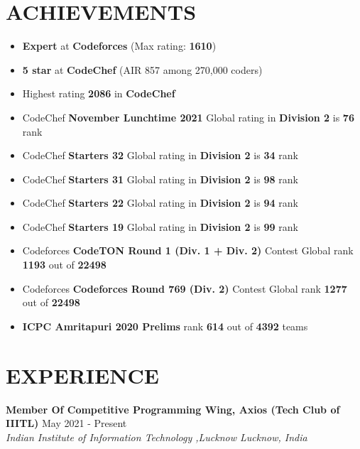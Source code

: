 \documentclass[12pt]{article}
\begin{document}
\section*{ACHIEVEMENTS}
\begin{itemize}[leftmargin=*, topsep=0pt,itemsep=2pt,partopsep=2pt, parsep=2pt]
\item \textbf{Expert} at \textbf{Codeforces} (Max rating: \textbf{1610})
\item \textbf{5 star} at \textbf{CodeChef} (AIR 857 among 270,000 coders)
\item Highest rating \textbf{2086} in \textbf{CodeChef}
\item CodeChef \textbf{November Lunchtime 2021} Global rating in \textbf{Division 2} is \textbf{76} rank
\item CodeChef \textbf{Starters 32} Global rating in \textbf{Division 2} is \textbf{34} rank
\item CodeChef \textbf{Starters 31} Global rating in \textbf{Division 2} is \textbf{98} rank
\item CodeChef \textbf{Starters 22} Global rating in \textbf{Division 2} is \textbf{94} rank
\item CodeChef \textbf{Starters 19} Global rating in \textbf{Division 2} is \textbf{99} rank
\item Codeforces \textbf{CodeTON Round 1 (Div. 1 + Div. 2)} Contest Global rank \textbf{1193} out of \textbf{22498}
\item Codeforces \textbf{Codeforces Round 769 (Div. 2)} Contest Global rank \textbf{1277} out of \textbf{22498}
\item \textbf{ICPC Amritapuri 2020 Prelims} rank \textbf{614} out of \textbf{4392} teams
\end{itemize}

\section*{EXPERIENCE}
\textbf{Member Of Competitive Programming Wing, Axios (Tech Club of IIITL)} \hfill May 2021 - Present \\
\textit{Indian Institute of Information Technology ,Lucknow Lucknow, India}
\end{document}
